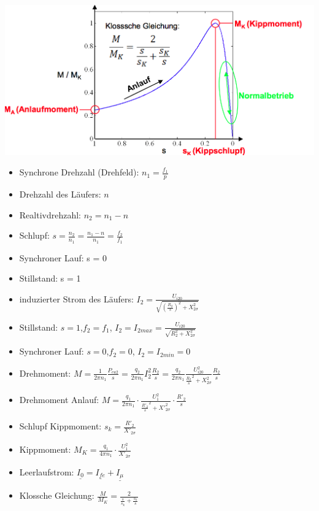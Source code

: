 \begin{minipage}{0.3 \linewidth}
\includegraphics[width = \linewidth]{./Pics/VL1213/Funktion4}
\end{minipage}
\begin{minipage}{0.7 \linewidth}
\begin{itemize}
\item Synchrone Drehzahl (Drehfeld): $n_1 = \frac{f_1}{p}$
\item Drehzahl des Läufers: $n$
\item Realtivdrehzahl: $n_2 = n_1 - n$
\item Schlupf: $s = \frac{n_2}{n_1} = \frac{n_1-n}{n_1} = \frac{f_2}{f_1}$
\item Synchroner Lauf: s = 0
\item Stillstand: s = 1
\item induzierter Strom des Läufers: $I_2 = \frac{U_{i20}}{\sqrt{(\frac{R_2}{s})^2 + X_{2\sigma}^2}}$
\item Stillstand: $s = 1$,$f_2 = f_1$, $I_2 = I_{2max} = \frac{U_{i20}}{\sqrt{R_2^2 + X_{2\sigma}^2}}$
\item Synchroner Lauf: $s = 0$,$f_2 = 0$, $I_2 = I_{2min} = 0$
\item Drehmoment: $M = \frac{1}{2\pi n_1} \frac{P_{cu2}}{s} = \frac{q_2}{2\pi n_1} I_2^2 \frac{R_2}{s} = \frac{q_2}{2 \pi n_1} \frac{U_{i20}^2}{\frac{R_2}{s}^2 + X_{2\sigma}^2} \frac{R_2}{s}$
\item Drehmoment Anlauf: $M = \frac{q_1}{2 \pi n_1} \cdot \frac{U_1^2}{\frac{R'_2}{s}^2 + X'^2_{2\sigma}} \cdot \frac{R'_2}{s}$
\item Schlupf Kippmoment: $s_k = \frac{R'_2}{X'_{2\sigma}}$
\item Kippmoment: $M_K = \frac{q_1}{4\pi n_1} \cdot \frac{U_1^2}{X'_{2\sigma}}$
\item Leerlaufstrom: $\underline{I_0} = \underline{I_{fe}} + \underline{I_\mu}$
\item Klossche Gleichung: $\frac{M}{M_K} = \frac{2}{\frac{s}{s_k} + \frac{s_k}{s}}$
\end{itemize}
\end{minipage}

